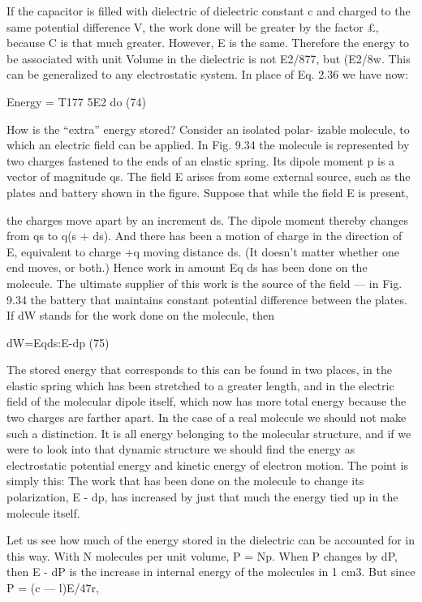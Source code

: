 If the capacitor is filled with dielectric of dielectric constant c and
charged to the same potential difference V, the work done will be
greater by the factor £, because C is that much greater. However,
E is the same. Therefore the energy to be associated with unit
Volume in the dielectric is not E2/877, but (E2/8w. This can be generalized
to any electrostatic system. In place of Eq. 2.36 we have now:

\begin{equation}
\end{equation}
Energy = T177 5E2 do (74)

How is the ``extra'' energy stored? Consider an isolated polar-
izable molecule, to which an electric field can be applied. In Fig. 9.34
the molecule is represented by two charges fastened to the ends of
an elastic spring. Its dipole moment p is a vector of magnitude qs.
The field E arises from some external source, such as the plates and
battery shown in the figure. Suppose that while the field E is present,

the charges move apart by an increment ds. The dipole moment
thereby changes from qs to q(s + ds). And there has been a motion
of charge in the direction of E, equivalent to charge +q moving distance
ds. (It doesn't matter whether one end moves, or both.)
Hence work in amount Eq ds has been done on the molecule. The
ultimate supplier of this work is the source of the field --- in Fig. 9.34
the battery that maintains constant potential difference between the
plates. If dW stands for the work done on the molecule, then

\begin{equation}
\end{equation}
dW=Eqds:E-dp (75)

The stored energy that corresponds to this can be found in two
places, in the elastic spring which has been stretched to a greater
length, and in the electric field of the molecular dipole itself, which
now has more total energy because the two charges are farther apart.
In the case of a real molecule we should not make such a distinction.
It is all energy belonging to the molecular structure, and if we were
to look into that dynamic structure we should find the energy as
electrostatic potential energy and kinetic energy of electron motion.
The point is simply this: The work that has been done on the molecule
to change its polarization, E - dp, has increased by just that much
the energy tied up in the molecule itself.

Let us see how much of the energy stored in the dielectric can be
accounted for in this way. With N molecules per unit volume,
P = Np. When P changes by dP, then E - dP is the increase in internal
energy of the molecules in 1 cm3. But since P = (c  ---  l)E/47r,

